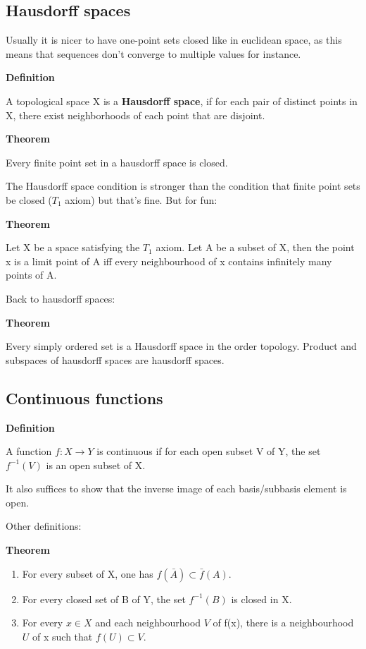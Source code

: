 \documentclass[11pt]{article}
\begin{document}
\subsection{Hausdorff spaces}
\label{sec:org8681341}

Usually it is nicer to have one-point sets closed like in euclidean space, as this means that sequences don't converge to multiple values for instance.

\textbf{Definition}

A topological space X is a \textbf{Hausdorff space}, if for each pair of distinct points in X, there exist neighborhoods of each point that are disjoint.

\textbf{Theorem}

Every finite point set in a hausdorff space is closed.

The Hausdorff space condition is stronger than the condition that finite point sets be closed (\(T_1\) axiom) but that's fine. But for fun:

\textbf{Theorem}

Let X be a space satisfying the \(T_1\) axiom. Let A be a subset of X, then the point x is a limit point of A iff every neighbourhood of x contains infinitely many points of A.

Back to hausdorff spaces:

\textbf{Theorem}

Every simply ordered set is a Hausdorff space in the order topology. Product and subspaces of hausdorff spaces are hausdorff spaces.
\subsection{Continuous functions}
\label{sec:orgd127057}

\textbf{Definition}

A function \(f : X \to Y\) is continuous if for each open subset V of Y, the set \(f^{-1}(V)\) is an open subset of X.

It also suffices to show that the inverse image of each basis/subbasis element is open.

Other definitions:

\textbf{Theorem}

\begin{enumerate}
\item For every subset of X, one has \(f(\bar{A}) \subset \bar{f}(A)\).
\item For every closed set of B of Y, the set \(f^{-1}(B)\) is closed in X.
\item For every \(x \in X\) and each neighbourhood \(V\) of f(x), there is a neighbourhood \(U\) of x such that \(f(U) \subset V\).
\end{enumerate}
\end{document}
